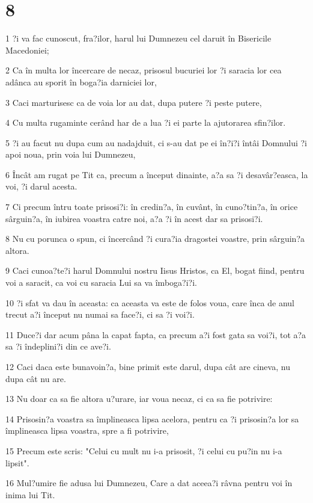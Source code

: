 \chapter{8}

\par 1 ?i va fac cunoscut, fra?ilor, harul lui Dumnezeu cel daruit în Bisericile Macedoniei;
\par 2 Ca în multa lor încercare de necaz, prisosul bucuriei lor ?i saracia lor cea adânca au sporit în boga?ia darniciei lor,
\par 3 Caci marturisesc ca de voia lor au dat, dupa putere ?i peste putere,
\par 4 Cu multa rugaminte cerând har de a lua ?i ei parte la ajutorarea sfin?ilor.
\par 5 ?i au facut nu dupa cum au nadajduit, ci s-au dat pe ei în?i?i întâi Domnului ?i apoi noua, prin voia lui Dumnezeu,
\par 6 Încât am rugat pe Tit ca, precum a început dinainte, a?a sa ?i desavâr?easca, la voi, ?i darul acesta.
\par 7 Ci precum întru toate prisosi?i: în credin?a, în cuvânt, în cuno?tin?a, în orice sârguin?a, în iubirea voastra catre noi, a?a ?i în acest dar sa prisosi?i.
\par 8 Nu cu porunca o spun, ci încercând ?i cura?ia dragostei voastre, prin sârguin?a altora.
\par 9 Caci cunoa?te?i harul Domnului nostru Iisus Hristos, ca El, bogat fiind, pentru voi a saracit, ca voi cu saracia Lui sa va îmboga?i?i.
\par 10 ?i sfat va dau în aceasta: ca aceasta va este de folos voua, care înca de anul trecut a?i început nu numai sa face?i, ci sa ?i voi?i.
\par 11 Duce?i dar acum pâna la capat fapta, ca precum a?i fost gata sa voi?i, tot a?a sa ?i îndeplini?i din ce ave?i.
\par 12 Caci daca este bunavoin?a, bine primit este darul, dupa cât are cineva, nu dupa cât nu are.
\par 13 Nu doar ca sa fie altora u?urare, iar voua necaz, ci ca sa fie potrivire:
\par 14 Prisosin?a voastra sa împlineasca lipsa acelora, pentru ca ?i prisosin?a lor sa împlineasca lipsa voastra, spre a fi potrivire,
\par 15 Precum este scris: "Celui cu mult nu i-a prisosit, ?i celui cu pu?in nu i-a lipsit".
\par 16 Mul?umire fie adusa lui Dumnezeu, Care a dat aceea?i râvna pentru voi în inima lui Tit.
